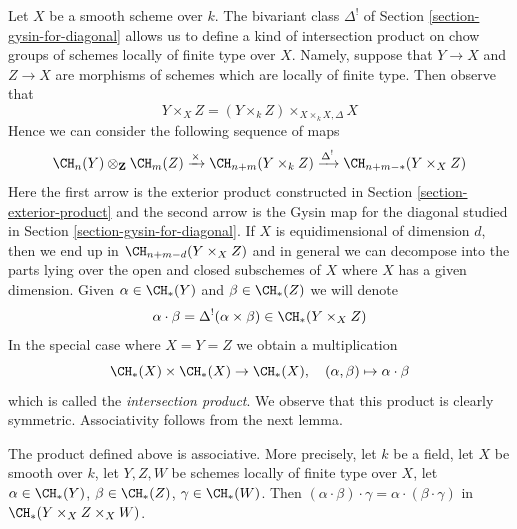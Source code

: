 \medskip\noindent
Let $X$ be a smooth scheme over $k$. The bivariant class $\Delta^!$
of Section \ref{section-gysin-for-diagonal} allows us to define a kind of
intersection product on chow groups of schemes locally of finite type over $X$.
Namely, suppose that $Y \to X$ and $Z \to X$ are morphisms of schemes
which are locally of finite type. Then observe that
$$
Y \times_X Z =  (Y \times_k Z) \times_{X \times_k X, \Delta} X
$$
Hence we can consider the following sequence of maps
$$
\CH_n(Y) \otimes_\mathbf{Z} \CH_m(Z)
\xrightarrow{\times}
\CH_{n + m}(Y \times_k Z)
\xrightarrow{\Delta^!}
\CH_{n + m - *}(Y \times_X Z)
$$
Here the first arrow is the exterior product constructed in
Section \ref{section-exterior-product} and the second arrow
is the Gysin map for the diagonal studied in
Section \ref{section-gysin-for-diagonal}. If $X$ is equidimensional
of dimension $d$, then we end up in $\CH_{n + m - d}(Y \times_X Z)$
and in general we can decompose into the parts lying over the open
and closed subschemes of $X$ where $X$ has a given dimension.
Given $\alpha \in \CH_*(Y)$ and $\beta \in \CH_*(Z)$ we will denote
$$
\alpha \cdot \beta = \Delta^!(\alpha \times \beta)
\in \CH_*(Y \times_X Z)
$$
In the special case where $X = Y = Z$ we obtain a multiplication
$$
\CH_*(X) \times \CH_*(X) \to \CH_*(X),\quad
(\alpha, \beta) \mapsto \alpha \cdot \beta
$$
which is called the {\it intersection product}. We observe that
this product is clearly symmetric. Associativity follows from
the next lemma.

\begin{lemma}
\label{lemma-associative}
The product defined above is associative. More precisely, let $k$ be a field,
let $X$ be smooth over $k$,
let $Y, Z, W$ be schemes locally of finite type over $X$, let
$\alpha \in \CH_*(Y)$, $\beta \in \CH_*(Z)$, $\gamma \in \CH_*(W)$.
Then $(\alpha \cdot \beta) \cdot \gamma =
\alpha \cdot (\beta \cdot \gamma)$ in $\CH_*(Y \times_X Z \times_X W)$.
\end{lemma}

